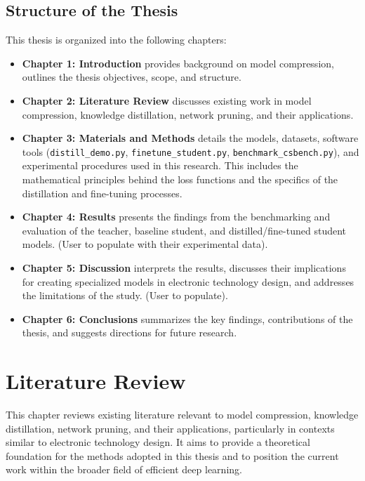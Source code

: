 \documentclass[12pt, a4paper]{report}
\begin{document}
\section{Structure of the Thesis}
\label{sec:thesis_structure}
This thesis is organized into the following chapters:
\begin{itemize}
    \item \textbf{Chapter 1: Introduction} provides background on model compression, outlines the thesis objectives, scope, and structure.
    \item \textbf{Chapter 2: Literature Review} discusses existing work in model compression, knowledge distillation, network pruning, and their applications.
    \item \textbf{Chapter 3: Materials and Methods} details the models, datasets, software tools (\texttt{distill\_demo.py}, \texttt{finetune\_student.py}, \texttt{benchmark\_csbench.py}), and experimental procedures used in this research. This includes the mathematical principles behind the loss functions and the specifics of the distillation and fine-tuning processes.
    \item \textbf{Chapter 4: Results} presents the findings from the benchmarking and evaluation of the teacher, baseline student, and distilled/fine-tuned student models. (User to populate with their experimental data).
    \item \textbf{Chapter 5: Discussion} interprets the results, discusses their implications for creating specialized models in electronic technology design, and addresses the limitations of the study. (User to populate).
    \item \textbf{Chapter 6: Conclusions} summarizes the key findings, contributions of the thesis, and suggests directions for future research.
\end{itemize}

\chapter{Literature Review}
\label{chap:literature_review}
This chapter reviews existing literature relevant to model compression, knowledge distillation, network pruning, and their applications, particularly in contexts similar to electronic technology design. It aims to provide a theoretical foundation for the methods adopted in this thesis and to position the current work within the broader field of efficient deep learning.
\end{document}
